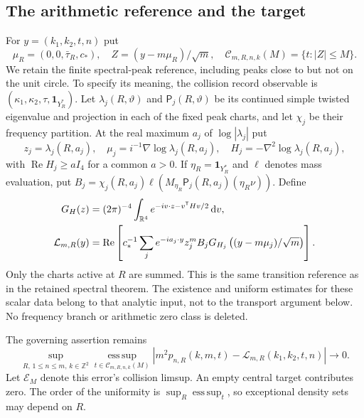 \documentclass[11pt,reqno]{amsart}
\numberwithin{equation}{section}
\theoremstyle{definition}\newtheorem{definition}[theorem]{Definition}
\theoremstyle{remark}\newtheorem{remark}[theorem]{Remark}
\newcommand{\R}{\mathbb R}\newcommand{\Z}{\mathbb Z}\newcommand{\T}{\mathbb T}
\newcommand{\dd}{\,\mathrm d}\newcommand{\one}{\mathbf1}
\theoremstyle{definition}\newtheorem{inputstatement}[theorem]{Input statement}
\newcommand{\esssup}{\operatorname*{ess\,sup}}
\begin{document}
\subsection{The arithmetic reference and the target}
For $y=(k_1,k_2,t,n)$ put
\[
 \mu_R=(0,0,\bar\tau_R,c_*),\quad
 Z=(y-m\mu_R)/\sqrt m,\quad
 \mathcal C_{m,R,n,k}(M)=\{t:|Z|\le M\}.
\]
We retain the finite spectral-peak reference, including peaks close to
but not on the unit circle. To specify its meaning, the collision
record observable is $(\kappa_1,\kappa_2,\tau,\one_{Y_R^*})$.
Let $\lambda_j(R,\vartheta)$ and $\mathsf P_j(R,\vartheta)$ be its
continued simple twisted eigenvalue and projection in each of the
fixed peak charts, and let $\chi_j$ be their frequency partition.
At the real maximum $a_j$ of $\log|\lambda_j|$ put
\[
 z_j=\lambda_j(R,a_j),\quad
 \mu_j=i^{-1}\nabla\log\lambda_j(R,a_j),\quad
 H_j=-\nabla^2\log\lambda_j(R,a_j),
\]
with $\operatorname{Re}H_j\ge aI_4$ for a common $a>0$. If
$\eta_R=\one_{Y_R^*}$ and $\ell$ denotes mass evaluation, put
$B_j=\chi_j(R,a_j)\ell(M_{\eta_R}\mathsf P_j(R,a_j)(\eta_R\nu))$.
Define
\begin{align}
 G_H(z)&=(2\pi)^{-4}\int_{\R^4}e^{-iv\cdot z-v^{\mathsf T}Hv/2}\dd v,
 \notag\\
 \mathcal L_{m,R}(y)&=\operatorname{Re}\left[
 c_*^{-1}\sum_j e^{-ia_j\cdot y}z_j^m B_j
      G_{H_j}\left((y-m\mu_j)/\sqrt m\right)\right].
 \label{eq:v76-reference}
\end{align}
Only the charts active at $R$ are summed. This is the same transition
reference as in the retained spectral theorem. The existence and
uniform estimates for these scalar data belong to that analytic
input, not to the transport argument below. No frequency branch or
arithmetic zero class is deleted.

The governing assertion remains
\begin{equation}\label{eq:v76-target}
 \sup_{R,\,1\le n\le m,\,k\in\Z^2}
 \esssup_{t\in\mathcal C_{m,R,n,k}(M)}
 |m^2p_{n,R}(k,m,t)-\mathcal L_{m,R}(k_1,k_2,t,n)|\longrightarrow0.
\end{equation}
Let $\mathcal E_M$ denote this error's collision limsup. An empty
central target contributes zero. The order of the uniformity is
$\sup_R\esssup_t$, so exceptional density sets may depend on $R$.
\end{document}
